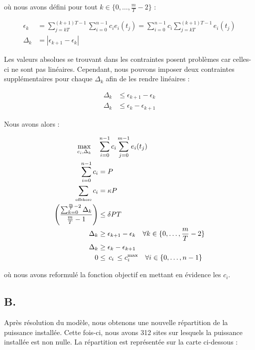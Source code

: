 \documentclass{article}
\begin{document}
où nous avons défini pour tout $k \in \{ 0, \ldots, \frac{m}{T} - 2 \}$ :

\begin{align*}
    \epsilon_k &= \sum_{j = kT}^{(k+1)T - 1} \sum_{i = 0}^{n-1} c_i e_i(t_j) = \sum_{i=0}^{n-1} c_i \sum_{j = kT}^{(k+1)T - 1} e_i(t_j)\\
    \Delta_k &= | \epsilon_{k+1} - \epsilon_k |
\end{align*}

Les valeurs absolues se trouvant dans les contraintes posent problèmes car celles-ci ne sont pas linéaires. Cependant, nous pouvons imposer deux contraintes supplémentaires pour chaque $\Delta_k$ afin de les rendre linéaires :

\begin{align*}
    \Delta_k &\leq \epsilon_{k+1} - \epsilon_k\\
    \Delta_k &\leq \epsilon_k - \epsilon_{k+1}
\end{align*}

Nous avons alors :

\begin{align*}
    \max_{c_i, \Delta_k} \quad  
    &\sum_{i=0}^{n-1} c_i \sum_{j = 0}^{m - 1} e_i(t_j) \\ 
    \sum_{i=0}^{n-1} c_i &= P\\
    \sum_{\text{\tiny offshore}}c_i &= \kappa P\\
    \left( \frac{\sum_{k = 0}^{\frac{m}{T} - 2} \Delta_k }{\frac{m}{T} - 1}\right) &\leq \delta PT\\
    \Delta_k &\ge \epsilon_{k+1} - \epsilon_k \quad \forall k \in \{ 0, \ldots, \frac{m}{T} - 2 \}\\
    \Delta_k &\ge \epsilon_k - \epsilon_{k+1}\\
    0 &\le \, c_i \, \le c_i^{\max} \quad \forall i \in \{0, \ldots, n-1\}
\end{align*}

où nous avons reformulé la fonction objectif en mettant en évidence les $c_i$.

\subsection*{B.}
Après résolution du modèle, nous obtenons une nouvelle répartition de la puissance installée. Cette fois-ci, nous avons 312 sites sur lesquels la puissance installée est non nulle. La répartition est représentée sur la carte ci-dessous :
\end{document}
